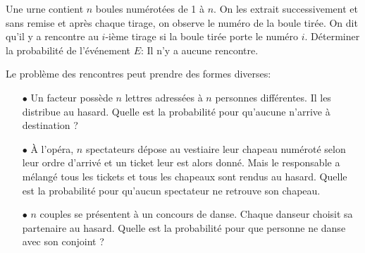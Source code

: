 



\begin{exercice} 
Une urne contient $n$ boules num\'erot\'ees de 1 \`a $n$. On les extrait successivement et sans remise et apr\`es chaque tirage, on observe le num\'ero de la boule tir\'ee. On dit qu'il y a rencontre au $i$-i\`eme tirage si la boule tir\'ee porte le num\'ero $i$. D\'eterminer la probabilit\'e de l'\'ev\'enement $E$: \og Il n'y a aucune rencontre\fg.

\begin{rems}
Le probl\`{e}me des rencontres peut prendre des formes diverses:
\begin{itemize}
\item[$\bullet$] Un facteur poss\`{e}de $n$ lettres adress\'ees \`{a} $n$ personnes diff\'erentes. Il les distribue au hasard. Quelle est la probabilit\'e pour qu'aucune n'arrive \`{a} destination ?
\item[$\bullet$] \`{A} l'op\'era, $n$ spectateurs d\'epose au vestiaire leur chapeau num\'erot\'e selon leur ordre d'arriv\'e et un ticket leur est alors donn\'e. Mais le responsable a m\'elang\'e tous les tickets et tous les chapeaux sont rendus au hasard. Quelle est la probabilit\'e pour qu'aucun spectateur ne retrouve son chapeau.
\item[$\bullet$] $n$ couples se pr\'esentent \`{a} un concours de danse. Chaque danseur choisit sa partenaire au hasard. Quelle est la probabilit\'e pour que personne ne danse avec son conjoint ?
\end{itemize}
\end{rems}

\end{exercice}



